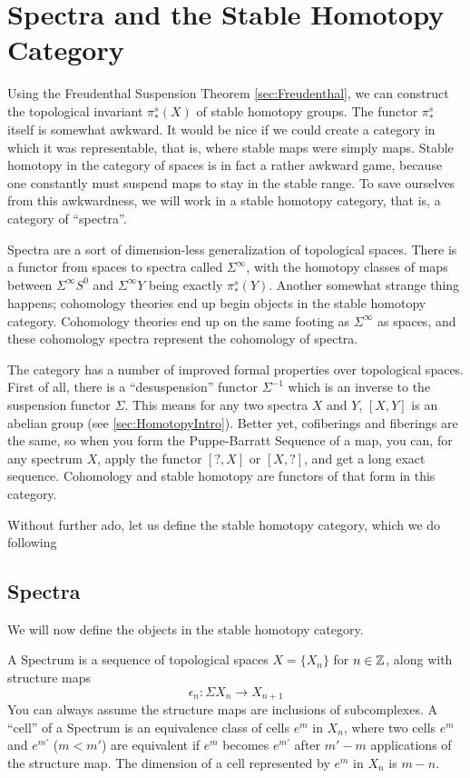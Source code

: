 \section{Spectra and the Stable Homotopy Category}

Using the Freudenthal Suspension Theorem \ref{sec:Freudenthal}, we can construct the topological invariant $\pi_*^s(X)$ of stable homotopy groups.  
The functor $\pi_*^s$ itself is somewhat awkward.
It would be nice if we could create a category in which it was representable, that is, where stable maps were simply maps.  
Stable homotopy in the category of spaces is in fact a rather awkward game, because one constantly must suspend maps to stay in the stable range.
To save ourselves from this awkwardness, we will work in a stable homotopy category, that is, a category of ``spectra''.  

Spectra are a sort of dimension-less generalization of topological spaces.  
There is a functor from spaces to spectra called $\Sigma^\infty$, 
with the homotopy classes of maps between $\Sigma^\infty S^0$ and $\Sigma^\infty Y$ being exactly $\pi_*^s(Y)$.  
Another somewhat strange thing happens; cohomology theories end up begin objects in the stable homotopy category.  
Cohomology theories end up on the same footing as $\Sigma^\infty$ as spaces, and these cohomology spectra represent the cohomology of spectra.  

The category has a number of improved formal properties over topological spaces.  
First of all, there is a ``desuspension'' functor $\Sigma^{-1}$ which is an inverse to the suspension functor $\Sigma$.  
This means for any two spectra $X$ and $Y$, $[X,Y]$ is an abelian group (see \ref{sec:HomotopyIntro}).  
Better yet, cofiberings and fiberings are the same, so when you form the Puppe-Barratt Sequence of a map, you can, 
for any spectrum $X$, apply the functor $[?,X]$ or $[X,?]$, and get a long exact sequence.  
Cohomology and stable homotopy are functors of that form in this category.  

Without further ado, let us define the stable homotopy category, which we do following \cite{AdamsStable}


\subsection{Spectra}

We will now define the objects in the stable homotopy category.  
\begin{Def}
  A Spectrum is a sequence of topological spaces $X=\{X_n\}$ for $n\in \mathbb{Z}$, along with structure maps 
  \[\epsilon_n:\Sigma X_n\to X_{n+1}\]
  You can always assume the structure maps are inclusions of subcomplexes.  
  A ``cell'' of a Spectrum is an equivalence class of cells $e^m$ in $X_n$, where two cells $e^m$ and $e^{m'}$ ($m<m'$) are equivalent if $e^m$ 
  becomes $e^{m'}$ after $m'-m$ applications of the structure map.  
  The dimension of a cell represented by $e^m$ in $X_n$ is $m-n$.  
\end{Def}

